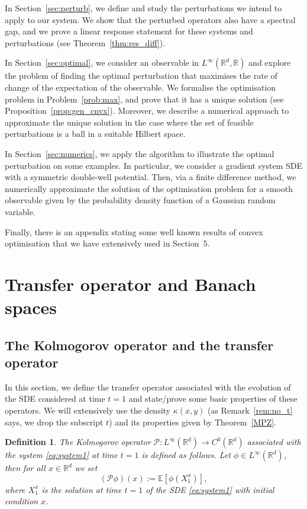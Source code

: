 \documentclass{amsart}
\newtheorem{definition}[theorem]{Definition}
\newcommand\cP{{\mathcal P}}
\begin{document}
In Section~\ref{sec:perturb}, we define and study the perturbations we intend to apply to our system. We show that the perturbed operators also have a spectral gap, and we prove a linear response statement for these systems and perturbations (see Theorem~\ref{thm:res_diff}).

In Section~\ref{sec:optimal}, we consider an observable in $L^\infty(\mathbb{R}^d, \mathbb{R})$ and explore the problem of finding the optimal perturbation that maximises the rate of change of the expectation of the observable. We formalise the optimisation problem in Problem~\ref{prob:max}, and prove that it has a unique solution (see Proposition~\ref{prop:gen_cnvx}). Moreover, we describe a numerical approach to approximate the unique solution in the case where the set of feasible perturbations is a ball in a suitable Hilbert space.

In Section~\ref{sec:numerics}, we apply the algorithm to illustrate the optimal perturbation on some examples. In particular, we consider a gradient system SDE with a symmetric double-well potential. Then, via a finite difference method, we numerically approximate the solution of the optimisation problem for a smooth observable given by the probability density function of a Gaussian random variable.

Finally, there is an appendix stating some well known results of convex optimisation that we have extensively used in Section~5.



\section{Transfer operator and Banach spaces}\label{sec:to}
\subsection{The Kolmogorov operator and the transfer operator}
In this section, we define the transfer operator associated with the evolution of the SDE considered at time $t=1$ and state/prove some basic properties of these operators. We will extensively use the density \(\kappa(x,y)\) (as Remark~\ref{rem:no_t} says, we drop the subscript \(t\)) and its properties given by Theorem~\ref{MPZ}.
\begin{definition}
\label{def:koldef} The Kolmogorov operator $\cP:L^{\infty }(\mathbb{R}%
^{d})\rightarrow C^{0}(\mathbb{R}^{d})$ associated with the system %
\eqref{eq:system1} at time $t=1$ is defined as follows. Let $\phi \in L^{\infty }(%
\mathbb{R}^{d})$, then for all $ x\in \mathbb{R}^{d}$ we set
\begin{equation*}
(\cP\phi )(x):=\mathbb{E}[\phi (X_1^x)],
\end{equation*}
where $X_1^x$ is the solution at time $t =1$ of the SDE \eqref{eq:system1} with initial condition $x$.
\end{definition}
\end{document}
